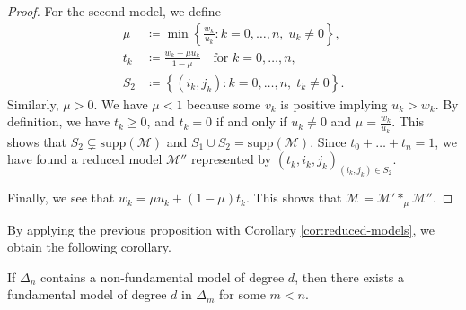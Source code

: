\begin{proof}
    For the second model, we define
    \begin{align*}
        \mu &\coloneqq \min \left\{ \frac{w_k}{u_k} : k = 0, \dots, n, \; u_k \neq 0 \right\}, \\
        t_k &\coloneqq \frac{w_k - \mu u_k}{1 - \mu} \quad \text{for } k = 0, \dots, n, \\
        S_2 &\coloneqq \left\{ (i_k, j_k) : k=0, \dots, n, \; t_k \neq 0 \right\}.
    \end{align*}
    Similarly, \( \mu > 0 \). We have \( \mu < 1 \) because some \( v_k \) is positive implying \( u_k > w_k \). By definition, we have \( t_k \geq 0 \), and \( t_k = 0 \) if and only if \( u_k \neq 0 \) and \( \mu = \frac{w_k}{u_k} \). This shows that \( S_2 \subsetneq  \mathrm{supp}(\mathcal{M}) \) and \( S_1 \cup S_2 = \mathrm{supp}(\mathcal{M}) \). Since \( t_0 + \dots + t_n = 1 \), we have found a reduced model \( \mathcal{M}'' \) represented by \( (t_k, i_k, j_k)_{(i_k,j_k) \in S_2} \).

    Finally, we see that \( w_k = \mu u_k + (1-\mu) t_k\). This shows that \( \mathcal{M} = \mathcal{M}' *_\mu \mathcal{M}'' \).
\end{proof}

By applying the previous proposition with Corollary \ref{cor:reduced-models}, we obtain the following corollary.

\begin{corollary}\label{cor:fundamental-models-ksmlkdf}
    If \( \Delta_n \) contains a non-fundamental model of degree \( d \), then there exists a fundamental model of degree \( d \) in \( \Delta_m \) for some \( m < n \).
\end{corollary}

